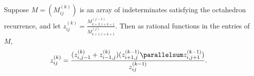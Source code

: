 \begin{Lemma}\label{lemma:arraytoggle}
Suppose $M = (M_{ij}^{(k)})$ is an array of indeterminates satisfying the octahedron recurrence, and let $z_{ij}^{(k)} = \frac{M_{k+2,i+k+1}^{(j-1)}}{M_{k+1,i+k+1}^{(j)}}$.
Then as rational functions in the entries of $M$, \[z_{ij}^{(k)} = \frac{(z_{i,j-1}^{(k)}+z_{i-1,j}^{(k)})(z_{i+1,j}^{(k-1)}\parallelsum z_{i,j+1}^{(k-1)})}{z_{ij}^{(k-1)}}.\]





\end{Lemma}




